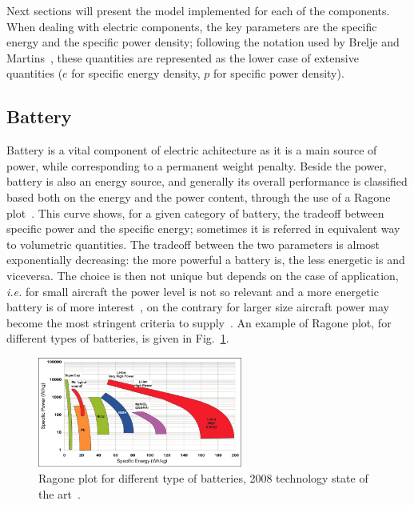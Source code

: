Next sections will present the model implemented for each of the components.
When dealing with electric components, the key parameters are the specific energy and the specific power density; following the notation used by Brelje and Martins~\cite{bib:brelje_biblio}, these quantities are represented as the lower case of extensive quantities ($e$ for specific energy density, $p$ for specific power density).

\subsection{Battery}
\label{subsec:chap3_batt_model}

Battery is a vital component of electric achitecture as it is a main source of power, while corresponding to a permanent weight penalty. 
Beside the power, battery is also an energy source, and generally its overall performance is classified based both on the energy and the power content, through the use of a Ragone plot~\cite{bib:ragone}. 
This curve shows, for a given category of battery, the tradeoff between specific power and the specific energy; sometimes it is referred in equivalent way to volumetric quantities. 
The tradeoff between the two parameters is almost exponentially decreasing: the more powerful a battery is, the less energetic is and viceversa. 
The choice is then not unique but depends on the case of application, \textit{i.e.} for small aircraft the power level is not so relevant and a more energetic battery is of more interest~\cite{bib:hepperle}, on the contrary for larger size aircraft power may become the most stringent criteria to supply~\cite{bib:kim_n3x_2014}. 
An example of Ragone plot, for different types of batteries, is given in Fig.~\ref{fig:battery_classification_ragone}. 
\begin{figure}[!h]
	\centering
	\includegraphics[keepaspectratio, width=0.6\textwidth]{images/chap3/battery_class_ragone.jpg}
	\caption{Ragone plot for different type of batteries, 2008 technology state of the art~\cite{bib:simon}.}
	\label{fig:battery_classification_ragone}
\end{figure}

